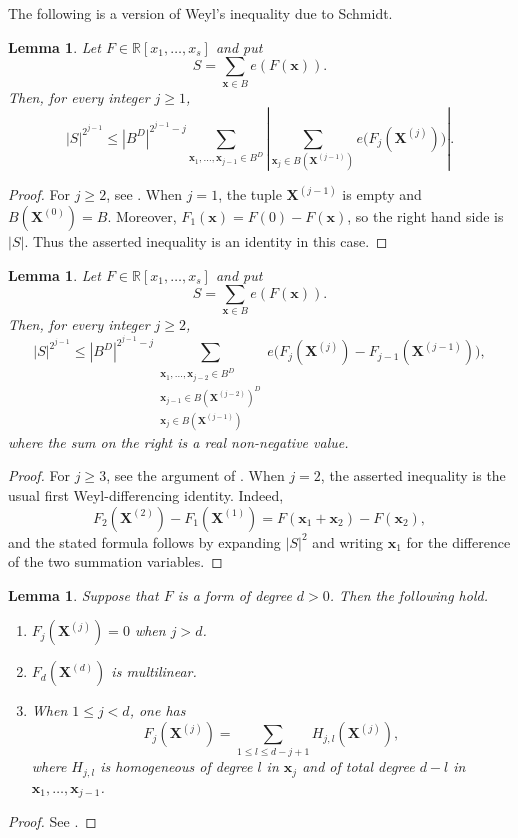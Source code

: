 \documentclass[12pt,reqno]{amsart}
\newtheorem{lemma}[theorem]{Lemma}
\theoremstyle{definition}
\theoremstyle{remark}
\numberwithin{equation}{section}
\def\bfx{{\mathbf x}}
\def\bfX{{\mathbf X}}
\def\R{{\mathbb R}}\def\T{{\mathbb T}}
\begin{document}
The following is a version of Weyl's inequality due to Schmidt.
\begin{lemma}\label{lemma:schmidtweyl}
    Let $F \in \R[x_1,\ldots,x_s]$ and put
    \[S = \sum_{\bfx \in B} e(F(\bfx)).\]
    Then, for every integer $j\geq1$,
    \[
    |S|^{2^{j-1}}
    \leq |B^D|^{2^{j-1}-j}
    \sum_{\bfx_1,\ldots,\bfx_{j-1}\in B^D}
    \left|\sum_{\bfx_j\in B(\bfX^{(j-1)})}
    e\bigl(F_j(\bfX^{(j)})\bigr)\right|.
    \]
\end{lemma}
\begin{proof}
    For $j\geq2$, see \cite[Lemma 11.1]{Schmidt1985}. When $j=1$, the tuple
    $\bfX^{(j-1)}$ is empty and $B(\bfX^{(0)})=B$. Moreover,
    $F_1(\bfx)=F(0)-F(\bfx)$, so the right hand side is $|S|$. Thus the
    asserted inequality is an identity in this case.
\end{proof}

\begin{lemma}\label{lemma:schindlerweyl}
    Let $F \in \R[x_1,\ldots,x_s]$ and put
    \[S = \sum_{\bfx \in B} e(F(\bfx)).\]
    Then, for every integer $j\geq2$,
    \[
    |S|^{2^{j-1}}\leq |B^D|^{2^{j-1}-j}
    \sum_{\substack{\bfx_1,\ldots,\bfx_{j-2}\in B^D \\
    \bfx_{j-1}\in B(\bfX^{(j-2)})^D \\
    \bfx_j\in B(\bfX^{(j-1)})}}
    e\bigl(F_j(\bfX^{(j)})-F_{j-1}(\bfX^{(j-1)})\bigr),
    \]
    where the sum on the right is a real non-negative value.
\end{lemma}
\begin{proof}
    For $j\geq3$, see the argument of \cite[\S 2]{Schindler2014}. When
    $j=2$, the asserted inequality is the usual first Weyl-differencing
    identity. Indeed,
    \[
        F_2(\bfX^{(2)})-F_1(\bfX^{(1)})
        =F(\bfx_1+\bfx_2)-F(\bfx_2),
    \]
    and the stated formula follows by expanding $|S|^2$ and writing
    $\bfx_1$ for the difference of the two summation variables.
\end{proof}

\begin{lemma}\label{lemma:schmidtdifferenceidentify}
    Suppose that $F$ is a form of degree $d>0$. Then the following hold.
    \begin{enumerate}
        \item[(a)] $F_j(\bfX^{(j)})=0$ when $j>d$.
        \item[(b)] $F_d(\bfX^{(d)})$ is multilinear.
        \item[(c)] When $1\leq j<d$, one has
        \[F_j(\bfX^{(j)})=\sum_{1\leq l\leq d-j+1}H_{j,l}(\bfX^{(j)}),\]
        where $H_{j,l}$ is homogeneous of degree $l$ in $\bfx_j$ and of
        total degree $d-l$ in $\bfx_1,\ldots,\bfx_{j-1}$.
    \end{enumerate}
\end{lemma}
\begin{proof}
    See \cite[Lemma 11.2]{Schmidt1985}.
\end{proof}
\end{document}
